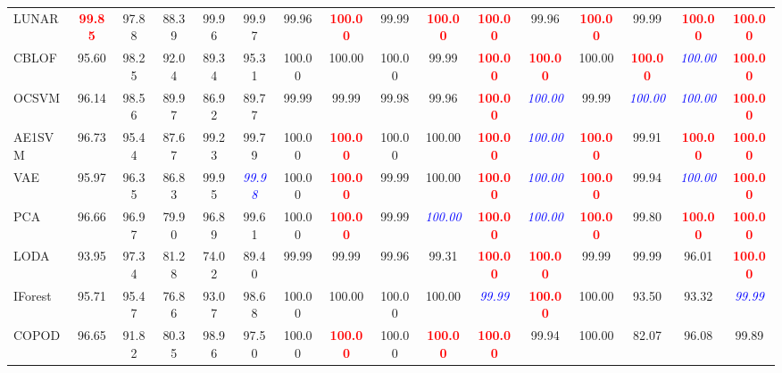 \documentclass[final,twocolumn,10pt]{elsarticle}
\begin{document}
\begin{table}[t]
{\begin{tabular}{l ccccc ccccc ccccc}
LUNAR & \textcolor{red}{\textbf{99.85}} & 97.88 & 88.39 & 99.96 & 99.97 & 99.96 & \textcolor{red}{\textbf{100.00}} & 99.99 & \textcolor{red}{\textbf{100.00}} & \textcolor{red}{\textbf{100.00}} & 99.96 & \textcolor{red}{\textbf{100.00}} & 99.99 & \textcolor{red}{\textbf{100.00}} & \textcolor{red}{\textbf{100.00}} \\
CBLOF & 95.60 & 98.25 & 92.04 & 89.34 & 95.31 & 100.00 & 100.00 & 100.00 & 99.99 & \textcolor{red}{\textbf{100.00}} & \textcolor{red}{\textbf{100.00}} & 100.00 & \textcolor{red}{\textbf{100.00}} & \textcolor{blue}{\textit{100.00}} & \textcolor{red}{\textbf{100.00}} \\
OCSVM & 96.14 & 98.56 & 89.97 & 86.92 & 89.77 & 99.99 & 99.99 & 99.98 & 99.96 & \textcolor{red}{\textbf{100.00}} & \textcolor{blue}{\textit{100.00}} & 99.99 & \textcolor{blue}{\textit{100.00}} & \textcolor{blue}{\textit{100.00}} & \textcolor{red}{\textbf{100.00}} \\
AE1SVM & 96.73 & 95.44 & 87.67 & 99.23 & 99.79 & 100.00 & \textcolor{red}{\textbf{100.00}} & 100.00 & 100.00 & \textcolor{red}{\textbf{100.00}} & \textcolor{blue}{\textit{100.00}} & \textcolor{red}{\textbf{100.00}} & 99.91 & \textcolor{red}{\textbf{100.00}} & \textcolor{red}{\textbf{100.00}} \\
VAE & 95.97 & 96.35 & 86.83 & 99.95 & \textcolor{blue}{\textit{99.98}} & 100.00 & \textcolor{red}{\textbf{100.00}} & 99.99 & 100.00 & \textcolor{red}{\textbf{100.00}} & \textcolor{blue}{\textit{100.00}} & \textcolor{red}{\textbf{100.00}} & 99.94 & \textcolor{blue}{\textit{100.00}} & \textcolor{red}{\textbf{100.00}} \\
PCA & 96.66 & 96.97 & 79.90 & 96.89 & 99.61 & 100.00 & \textcolor{red}{\textbf{100.00}} & 99.99 & \textcolor{blue}{\textit{100.00}} & \textcolor{red}{\textbf{100.00}} & \textcolor{blue}{\textit{100.00}} & \textcolor{red}{\textbf{100.00}} & 99.80 & \textcolor{red}{\textbf{100.00}} & \textcolor{red}{\textbf{100.00}} \\
LODA & 93.95 & 97.34 & 81.28 & 74.02 & 89.40 & 99.99 & 99.99 & 99.96 & 99.31 & \textcolor{red}{\textbf{100.00}} & \textcolor{red}{\textbf{100.00}} & 99.99 & 99.99 & 96.01 & \textcolor{red}{\textbf{100.00}} \\
IForest & 95.71 & 95.47 & 76.86 & 93.07 & 98.68 & 100.00 & 100.00 & 100.00 & 100.00 & \textcolor{blue}{\textit{99.99}} & \textcolor{red}{\textbf{100.00}} & 100.00 & 93.50 & 93.32 & \textcolor{blue}{\textit{99.99}} \\
COPOD & 96.65 & 91.82 & 80.35 & 98.96 & 97.50 & 100.00 & \textcolor{red}{\textbf{100.00}} & 100.00 & \textcolor{red}{\textbf{100.00}} & \textcolor{red}{\textbf{100.00}} & 99.94 & 100.00 & 82.07 & 96.08 & 99.89 \\

\end{tabular}}
\end{table}
\end{document}

